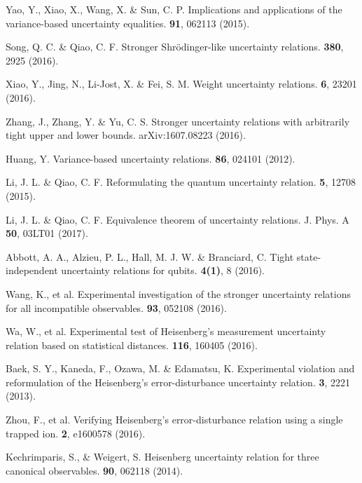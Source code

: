 \documentclass[fleqn,10pt]{wlscirep}
\begin{document}
\begin{thebibliography}{10}
 Yao, Y., Xiao, X., Wang, X. \& Sun, C. P.
\newblock Implications and applications of the variance-based uncertainty equalities.
 {\bf 91}, 062113 (2015).

 Song, Q. C. \& Qiao, C. F.
\newblock Stronger Shr\"odinger-like uncertainty relations.
 {\bf 380}, 2925 (2016).

 Xiao, Y., Jing, N., Li-Jost, X. \& Fei, S. M.
\newblock Weight uncertainty relations.
 {\bf 6}, 23201 (2016).

 Zhang, J., Zhang, Y. \& Yu, C. S.
\newblock Stronger uncertainty relations with arbitrarily tight upper and lower bounds.
  arXiv:1607.08223 (2016).

 Huang, Y.
\newblock Variance-based uncertainty relations.
 {\bf86}, 024101 (2012).

 Li, J. L. \& Qiao, C. F.
\newblock Reformulating the quantum uncertainty relation.
 {\bf 5}, 12708 (2015).

 Li, J. L. \& Qiao, C. F.
\newblock Equivalence theorem of uncertainty relations. J. Phys. A {\bf 50}, 03LT01 (2017).

 Abbott, A. A.,  Alzieu, P. L., Hall, M. J. W. \&  Branciard, C.
\newblock Tight state-independent uncertainty relations for qubits.
 {\bf 4(1)}, 8 (2016).

 Wang, K., et al.
\newblock Experimental investigation of the stronger uncertainty
    relations for all incompatible observables.
  {\bf 93}, 052108 (2016).

 Wa, W., et al.
\newblock Experimental test of Heisenberg's measurement uncertainty relation based on statistical distances.
 {\bf 116}, 160405 (2016).

 Baek, S. Y., Kaneda, F., Ozawa, M. \& Edamatsu, K.
\newblock Experimental violation and reformulation of the Heisenberg's error-disturbance uncertainty relation.
 {\bf 3}, 2221 (2013).

 Zhou, F., et al.
\newblock Verifying Heisenberg's error-disturbance relation using a single trapped ion.
 {\bf 2}, e1600578 (2016).

 Kechrimparis, S., \& Weigert, S.
\newblock Heisenberg uncertainty relation for three canonical observables.
 {\bf 90}, 062118 (2014).


\end{thebibliography}
\end{document}
